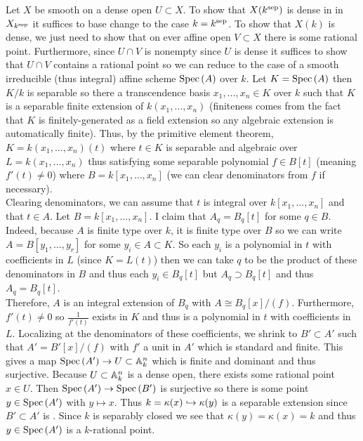 \documentclass[12pt]{article}
\begin{document}
Let $X$ be smooth on a dense open $U \subset X$. To show that $X(k^{\mathrm{sep}})$ is dense in in $X_{k^{\mathrm{sep}}}$ it suffices to base change to the case $k = k^{\mathrm{sep}}$. To show  that $X(k)$ is dense, we just need to show that on ever affine open $V \subset X$ there is some rational point. Furthermore, since $U \cap V$ is nonempty since $U$ is dense it suffices to show that $U \cap V$ contains a rational point so we can reduce to the case of a smooth irreducible (thus integral) affine scheme $\mathrm{Spec}\left( A \right)$ over $k$. Let $K = \mathrm{Spec}\left( A \right)$ then $K / k$ is separable so there a transcendence basis $x_1, \dots, x_n \in K$ over $k$ such that $K$ is a separable finite extension of $k(x_1, \dots, x_n)$ (finiteness comes from the fact that $K$ is finitely-generated as a field extension so any algebraic extension is automatically finite). Thus, by the primitive element theorem, $K = k(x_1, \dots, x_n)(t)$ where $t \in K$ is separable and algebraic over $L = k(x_1, \dots, x_n)$ thus satisfying some separable polynomial $f \in B[t]$ (meaning $f'(t) \neq 0$) where $B = k[x_1, \dots, x_n]$ (we can clear denominators from $f$ if necessary).
\bigskip\\
Clearing denominators, we can assume that $t$ is integral over $k[x_1, \dots, x_n]$ and that $t \in A$. Let $B = k[x_1, \dots, x_n]$. I claim that $A_q = B_q[t]$ for some $q \in B$.
\bigskip\\
Indeed, because $A$ is finite type over $k$, it is finite type over $B$ so we can write $A = B[y_1, \dots, y_r]$ for some $y_i \in A \subset K$. So each $y_i$ is a polynomial in $t$ with coefficients in $L$ (since $K = L(t)$) then we can take $q$ to be the product of these denominators in $B$ and thus each $y_i \in B_q[t]$ but $A_q \supset B_q[t]$ and thus $A_q = B_q[t]$.
\bigskip\\
Therefore, $A$ is an integral extension of $B_q$ with $A \cong B_q[x]/(f)$. Furthermore, $f'(t) \neq 0$ so $\frac{1}{f'(t)}$ exists in $K$ and thus is a polynomial in $t$ with coefficients in $L$. Localizing at the denominators of these coefficients, we shrink to $B' \subset A'$ such that $A' = B'[x]/(f)$ with $f'$ a unit in $A'$ which is standard \etale and finite. This gives a map $\mathrm{Spec}\left( A' \right) \to U \subset \mathbb{A}^n_k$ which is finite \etale and dominant and thus surjective. Because $U \subset \mathbb{A}^n_k$ is a dense open, there exists some rational point $x \in U$. Then $\mathrm{Spec}\left( A' \right) \to \mathrm{Spec}\left( B' \right)$ is surjective so there is some point $y \in \mathrm{Spec}\left( A' \right)$ with $y \mapsto x$. Thus $k = \kappa(x) \hookrightarrow \kappa(y)$ is a separable extension since $B' \subset A'$ is \etale. Since $k$ is separably closed we see that $\kappa(y) = \kappa(x) = k$ and thus $y \in \mathrm{Spec}\left( A' \right)$ is a $k$-rational point.
\end{document}
